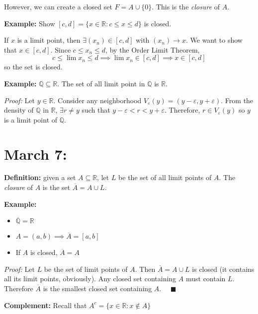 \documentclass[12pt]{report}
\renewcommand{\bar}[1]{\overline{#1}}
\newcommand{\R}{\mathbb{R}}
\newcommand{\Q}{\mathbb{Q}}
\newcommand{\qed}{\quad \blacksquare}
\newcommand{\ep}{\varepsilon}
\newenvironment*{tbox}[2][gray]{
    \begin{tcolorbox}[
        parbox=false,
        colback=#1!5!white,
        colframe=#1!75!black,
        breakable,
        title={#2}
    ]}
    {\end{tcolorbox}}
\begin{document}
    However, we can create a closed set $F = A \cup \{0\}$. This is the \emph{closure} of $A$. 

    \textbf{Example:} Show $[c, d] = \{x \in \R: c \leq x \leq d\}$ is closed. 
    
    If $x$ is a limit point, then $\exists (x_n) \in [c, d]$ with $(x_n) \to x$. We want to show that $x \in [c, d]$. Since $c\leq x_n \leq d$, by the Order Limit Theorem, 
    \[c \leq \lim x_n \leq d \implies \lim x_n \in [c, d] \implies x \in [c, d]\]
    so the set is closed. 

    \textbf{Example:} $\Q \subseteq \R$. The set of all limit point in $\Q$ is $\R$. 

    \emph{Proof:} Let $y \in \R$. Consider any neighborhood $V_{\ep}(y) = (y - \ep, y + \ep)$. From the density of $\Q$ in $\R$, $\exists r \neq y$ such that $y - \ep < r < y + \ep$. Therefore, $r \in V_{\ep}(y)$ so $y$ is a limit point of $\Q$. 

\section{March 7:} 
    \textbf{Definition:} given a set $A \subseteq \R$, let $L$ be the set of all limit points of $A$. The \emph{closure} of $A$ is the set $\overline{A} = A \cup L$.

    \textbf{Example:}
    \begin{itemize}
        \item  $\overline{\Q} = \R$
        \item $A = (a, b) \implies \overline A = [a, b]$ 
        \item If $A$ is closed, $\overline A = A$ 
    \end{itemize}

    \begin{tbox}{\textbf{Theorem:} For any $A \subseteq \R$, the closure $\bar A$ is a closed set and it is the smallest closed set containing $A$}
        \emph{Proof:} Let $L$ be the set of limit points of $A$. Then $\bar A = A \cup L$ is closed (it contains all its limit points, obviously). Any closed set containing $A$ must contain $L$. Therefore $\bar A$ is the smallest closed set containing $A$. $\qed$
    \end{tbox}

    \textbf{Complement:} Recall that $A^c = \{x \in \R: x \notin A\}$ 
\end{document}
